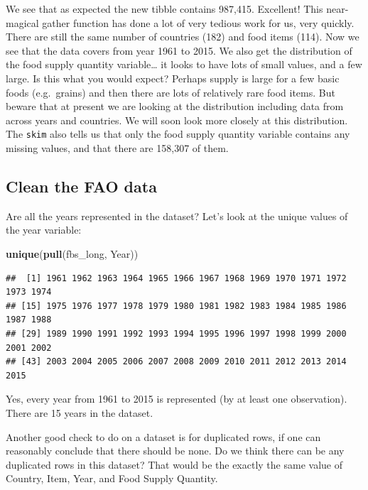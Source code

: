 \documentclass[]{book}
\newenvironment{Shaded}{\begin{snugshade}}{\end{snugshade}}
\newcommand{\KeywordTok}[1]{\textcolor[rgb]{0.13,0.29,0.53}{\textbf{#1}}}
\newcommand{\NormalTok}[1]{#1}
\begin{document}
We see that as expected the new tibble contains 987,415. Excellent! This near-magical gather function has done a lot of very tedious work for us, very quickly. There are still the same number of countries (182) and food items (114). Now we see that the data covers from year 1961 to 2015. We also get the distribution of the food supply quantity variable\ldots{} it looks to have lots of small values, and a few large. Is this what you would expect? Perhaps supply is large for a few basic foods (e.g.~grains) and then there are lots of relatively rare food items. But beware that at present we are looking at the distribution including data from across years and countries. We will soon look more closely at this distribution. The \texttt{skim} also tells us that only the food supply quantity variable contains any missing values, and that there are 158,307 of them.

\hypertarget{clean-the-fao-data}{%
\subsection{Clean the FAO data}\label{clean-the-fao-data}}

Are all the years represented in the dataset? Let's look at the unique values of the year variable:

\begin{Shaded}
\begin{Highlighting}[]
\KeywordTok{unique}\NormalTok{(}\KeywordTok{pull}\NormalTok{(fbs_long, Year))}
\end{Highlighting}
\end{Shaded}

\begin{verbatim}
##  [1] 1961 1962 1963 1964 1965 1966 1967 1968 1969 1970 1971 1972 1973 1974
## [15] 1975 1976 1977 1978 1979 1980 1981 1982 1983 1984 1985 1986 1987 1988
## [29] 1989 1990 1991 1992 1993 1994 1995 1996 1997 1998 1999 2000 2001 2002
## [43] 2003 2004 2005 2006 2007 2008 2009 2010 2011 2012 2013 2014 2015
\end{verbatim}

Yes, every year from 1961 to 2015 is represented (by at least one observation). There are 15 years in the dataset.

Another good check to do on a dataset is for duplicated rows, if one can reasonably conclude that there should be none. Do we think there can be any duplicated rows in this dataset? That would be the exactly the same value of Country, Item, Year, and Food Supply Quantity.
\end{document}
